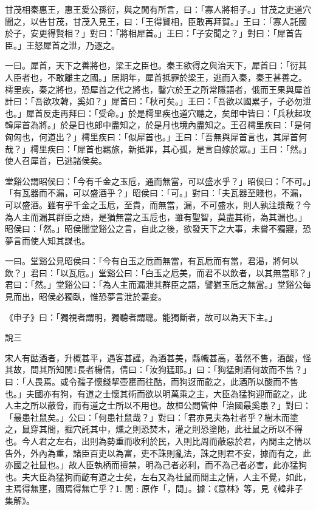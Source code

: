 \begin{pinyinscope}
甘茂相秦惠王，惠王愛公孫衍，與之閒有所言，曰：「寡人將相子。」甘茂之吏道穴聞之，以告甘茂，甘茂入見王，曰：「王得賢相，臣敢再拜賀。」王曰：「寡人託國於子，安更得賢相？」對曰：「將相犀首。」王曰：「子安聞之？」對曰：「犀首告臣。」王怒犀首之泄，乃逐之。

一曰。犀首，天下之善將也，梁王之臣也。秦王欲得之與治天下，犀首曰：「衍其人臣者也，不敢離主之國。」居期年，犀首抵罪於梁王，逃而入秦，秦王甚善之。樗里疾，秦之將也，恐犀首之代之將也，鑿穴於王之所常隱語者，俄而王果與犀首計曰：「吾欲攻韓，奚如？」犀首曰：「秋可矣。」王曰：「吾欲以國累子，子必勿泄也。」犀首反走再拜曰：「受命。」於是樗里疾也道穴聽之，矣郎中皆曰：「兵秋起攻韓犀首為將。」於是日也郎中盡知之，於是月也境內盡知之。王召樗里疾曰：「是何匈匈也，何道出？」樗里疾曰：「似犀首也。」王曰：「吾無與犀首言也，其犀首何哉？」樗里疾曰：「犀首也羈旅，新抵罪，其心孤，是言自嫁於眾。」王曰：「然。」使人召犀首，已逃諸侯矣。

堂谿公謂昭侯曰：「今有千金之玉卮，通而無當，可以盛水乎？」昭侯曰：「不可。」「有瓦器而不漏，可以盛酒乎？」昭侯曰：「可。」對曰：「夫瓦器至賤也，不漏，可以盛酒。雖有乎千金之玉卮，至貴，而無當，漏，不可盛水，則人孰注漿哉？今為人主而漏其群臣之語，是猶無當之玉卮也，雖有聖智，莫盡其術，為其漏也。」昭侯曰：「然。」昭侯聞堂谿公之言，自此之後，欲發天下之大事，未嘗不獨寢，恐夢言而使人知其謀也。

一曰。堂谿公見昭侯曰：「今有白玉之卮而無當，有瓦卮而有當，君渴，將何以飲？」君曰：「以瓦卮。」堂谿公曰：「白玉之卮美，而君不以飲者，以其無當耶？」君曰：「然。」堂谿公曰：「為人主而漏泄其群臣之語，譬猶玉卮之無當。」堂谿公每見而出，昭侯必獨臥，惟恐夢言泄於妻妾。

《申子》曰：「獨視者謂明，獨聽者謂聰。能獨斷者，故可以為天下主。」

說三

宋人有酤酒者，升概甚平，遇客甚謹，為酒甚美，縣幟甚高，著然不售，酒酸，怪其故，問其所知閭1長者楊倩，倩曰：「汝狗猛耶。」曰：「狗猛則酒何故而不售？」曰：「人畏焉。或令孺子懷錢挈壺罋而往酤，而狗迓而齕之，此酒所以酸而不售也。」夫國亦有狗，有道之士懷其術而欲以明萬乘之主，大臣為猛狗迎而齕之，此人主之所以蔽脅，而有道之士所以不用也。故桓公問管仲「治國最奚患？」對曰：「最患社鼠矣。」公曰：「何患社鼠哉？」對曰：「君亦見夫為社者乎？樹木而塗之，鼠穿其間，掘穴託其中，燻之則恐焚木，灌之則恐塗阤，此社鼠之所以不得也。今人君之左右，出則為勢重而收利於民，入則比周而蔽惡於君，內閒主之情以告外，外內為重，諸臣百吏以為富，吏不誅則亂法，誅之則君不安，據而有之，此亦國之社鼠也。」故人臣執柄而擅禁，明為己者必利，而不為己者必害，此亦猛狗也。夫大臣為猛狗而齕有道之士矣，左右又為社鼠而閒主之情，人主不覺，如此，主焉得無壅，國焉得無亡乎？1. 閭 : 原作「，問」。據：《意林》等，見《韓非子集解》。


\end{pinyinscope}
